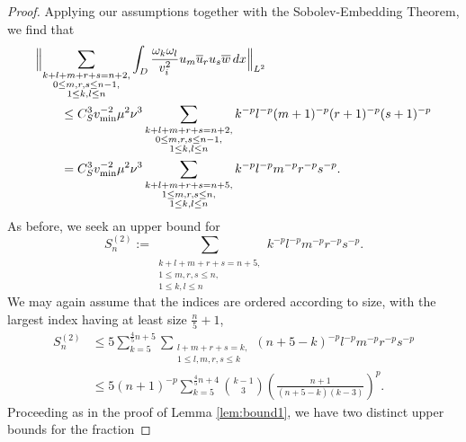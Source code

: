 \documentclass[a4paper,reqno,twoside]{amsart}
\numberwithin{equation}{section}
\theoremstyle{definition}
\newcommand{\<}{\ensuremath \leq}
\renewcommand{\>}{\ensuremath \geq}
\begin{document}
\begin{proof}
    Applying our assumptions together with the Sobolev-Embedding Theorem, we find that
    \begin{equation}
        \begin{aligned}
            &\Bigl\lVert \sum_{\substack{k+l+m+r+s = n+2, \\ 0 \leq m, r, s \leq n-1, \\ 1 \leq k, l \leq n}}
            \int_D \frac{\omega_k \omega_l}{v_i^2} u_m \overline{u}_r u_s \overline{w} \, dx
            \Bigr\rVert_{L^2} \\
            &\qquad \leq C_S^3 v_{\min}^{-2} \mu^2 \nu^3
              \sum_{\substack{k+l+m+r+s = n+2, \\ 0 \leq m, r, s \leq n-1, \\ 1 \leq k, l \leq n}}
              k^{-p} l^{-p} (m+1)^{-p} (r+1)^{-p} (s+1)^{-p} \\
            &\qquad = C_S^3 v_{\min}^{-2} \mu^2 \nu^3
              \sum_{\substack{k+l+m+r+s = n+5, \\ 1 \leq m, r, s \leq n, \\ 1 \leq k, l \leq n}}
              k^{-p} l^{-p} m^{-p} r^{-p} s^{-p}.
        \end{aligned}
    \end{equation}
    As before, we seek an upper bound for
    \begin{equation}
        S_n^{(2)} :=\sum_{\substack{k+l+m+r+s = n+5, \\ 1 \leq m, r, s \leq n, \\ 1 \leq k, l \leq n}}
        k^{-p} l^{-p} m^{-p} r^{-p} s^{-p}.
    \end{equation}
    We may again assume that the indices are ordered according to size, with the largest index having at least size $\frac{n}{5}+1$,
    \begin{equation}
        \begin{aligned}
            S_n^{(2)}
            &\leq 5 \sum_{k=5}^{\frac{4}{5}n+5}
              \sum_{\substack{l+m+r+s = k, \\ 1 \leq l, m, r, s \leq k}}
              (n+5-k)^{-p} l^{-p} m^{-p} r^{-p} s^{-p} \\
            &\leq 5 (n+1)^{-p}\sum_{k=5}^{\frac{4}{5}n+4}
              \binom{k-1}{3} \left(\frac{n+1}{(n+5-k)(k-3)}\right)^{p} . \
        \end{aligned}
    \end{equation}
    Proceeding as in the proof of Lemma \ref{lem:bound1}, we have two distinct upper bounds for the fraction

\end{proof}
\end{document}
